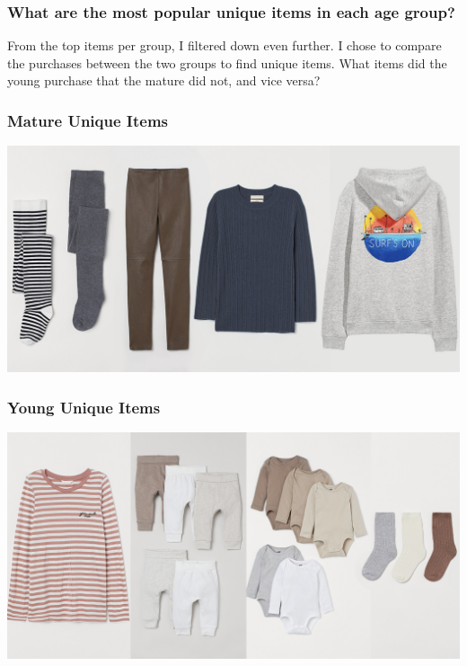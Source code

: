 \documentclass[
]{article}
\begin{document}
\hypertarget{what-are-the-most-popular-unique-items-in-each-age-group}{%
\subsubsection{What are the most popular unique items in each age
group?}\label{what-are-the-most-popular-unique-items-in-each-age-group}}

From the top items per group, I filtered down even further. I chose to
compare the purchases between the two groups to find unique items. What
items did the young purchase that the mature did not, and vice versa?

\hypertarget{mature-unique-items}{%
\subsubsection{Mature Unique Items}\label{mature-unique-items}}

\includegraphics{images/MATURE_unique_items.jpg}

\hypertarget{young-unique-items}{%
\subsubsection{Young Unique Items}\label{young-unique-items}}

\includegraphics{images/YOUNG_unique_items.jpg}
\end{document}
